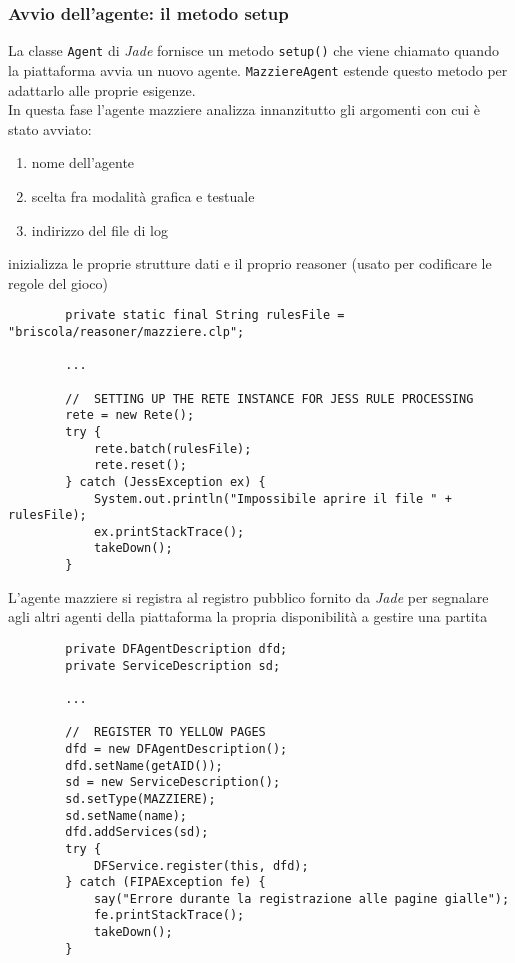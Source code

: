 \documentclass[runningheads,a4paper]{llncs}
\begin{document}
\subsubsection{Avvio dell'agente: il metodo setup}
La classe \texttt{Agent} di \emph{Jade} fornisce un metodo \texttt{setup()} che viene chiamato quando la piattaforma avvia un nuovo agente.
\texttt{MazziereAgent} estende questo metodo per adattarlo alle proprie esigenze.\\
In questa fase l'agente mazziere analizza innanzitutto gli argomenti con cui è stato avviato:
\begin{enumerate}
   \item nome dell'agente
   \item scelta fra modalità grafica e testuale
   \item indirizzo del file di log
\end{enumerate}
inizializza le proprie strutture dati e il proprio reasoner (usato per codificare le regole del gioco)
\begin{verbatim}
        private static final String rulesFile = "briscola/reasoner/mazziere.clp";
        
        ...
        
        //  SETTING UP THE RETE INSTANCE FOR JESS RULE PROCESSING
        rete = new Rete();
        try {
            rete.batch(rulesFile);
            rete.reset();
        } catch (JessException ex) {
            System.out.println("Impossibile aprire il file " + rulesFile);
            ex.printStackTrace();
            takeDown();
        }
\end{verbatim}


L'agente mazziere si registra al registro pubblico fornito da \emph{Jade} per segnalare agli altri agenti della piattaforma la propria disponibilità a gestire una partita

\begin{verbatim}
        private DFAgentDescription dfd;
        private ServiceDescription sd;
        
        ...
        
        //  REGISTER TO YELLOW PAGES
        dfd = new DFAgentDescription();
        dfd.setName(getAID());
        sd = new ServiceDescription();
        sd.setType(MAZZIERE);
        sd.setName(name);
        dfd.addServices(sd);
        try {
            DFService.register(this, dfd);
        } catch (FIPAException fe) {
            say("Errore durante la registrazione alle pagine gialle");
            fe.printStackTrace();
            takeDown();
        }
\end{verbatim}
\end{document}
